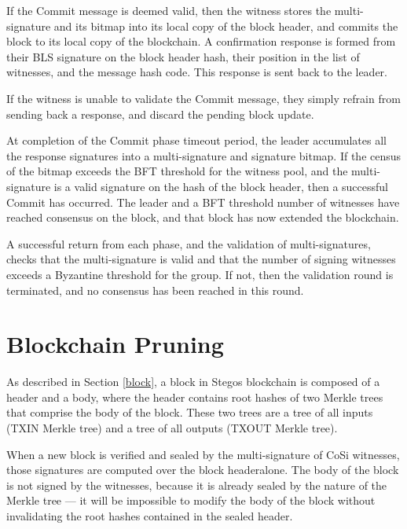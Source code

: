 \documentclass[a4paper, 10pt, conference]{ieeeconf}
\begin{document}
\begin{itemize}
{{	\item{If the Commit message is deemed valid, then the witness stores the multi-signature and its bitmap into its local copy of the block header, and commits the block to its local copy of the blockchain. A confirmation response is formed from their BLS signature on the block header hash, their position in the list of witnesses, and the message hash code. This response is sent back to the leader.}

	\item{If the witness is unable to validate the Commit message, they simply refrain from sending back a response, and discard the pending block update.}}

	\item{At completion of the Commit phase timeout period, the leader accumulates all the response signatures into a multi-signature and signature bitmap. If the census of the bitmap exceeds the BFT threshold for the witness pool, and the multi-signature is a valid signature on the hash of the block header, then a successful Commit has occurred. The leader and a BFT threshold number of witnesses have reached consensus on the block, and that block has now extended the blockchain.}
	}
\end{itemize}

A successful return from each phase, and the validation of multi-signatures, checks that the multi-signature is valid and that the number of signing witnesses exceeds a Byzantine threshold for the group. If not, then the validation round is terminated, and no consensus has been reached in this round.

\section{Blockchain Pruning}\label{pruning}

As described in Section \ref{block}, a block in Stegos blockchain is composed of a header and a body, where the header contains root hashes of two Merkle trees that comprise the body of the block. These two trees are a tree of all inputs (TXIN Merkle tree) and a tree of all outputs (TXOUT Merkle tree). 

When a new block is verified and sealed by the multi-signature of CoSi witnesses, those signatures are computed over the block headeralone. The body of the block is not signed by the witnesses, because it is already sealed by the nature of the Merkle tree --- it will be impossible to modify the body of the block without invalidating the root hashes contained in the sealed header.
\end{document}
